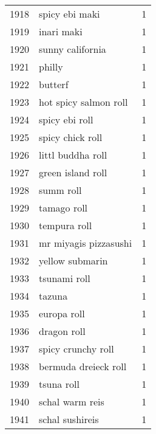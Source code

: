 \begin{tabular}{llr}
1918 &                                     spicy ebi maki &      1 \\
1919 &                                         inari maki &      1 \\
1920 &                                   sunny california &      1 \\
1921 &                                             philly &      1 \\
1922 &                                            butterf &      1 \\
1923 &                              hot spicy salmon roll &      1 \\
1924 &                                     spicy ebi roll &      1 \\
1925 &                                   spicy chick roll &      1 \\
1926 &                                  littl buddha roll &      1 \\
1927 &                                  green island roll &      1 \\
1928 &                                          summ roll &      1 \\
1929 &                                        tamago roll &      1 \\
1930 &                                       tempura roll &      1 \\
1931 &                              mr miyagis pizzasushi &      1 \\
1932 &                                    yellow submarin &      1 \\
1933 &                                       tsunami roll &      1 \\
1934 &                                             tazuna &      1 \\
1935 &                                        europa roll &      1 \\
1936 &                                        dragon roll &      1 \\
1937 &                                 spicy crunchy roll &      1 \\
1938 &                               bermuda dreieck roll &      1 \\
1939 &                                         tsuna roll &      1 \\
1940 &                                    schal warm reis &      1 \\
1941 &                                    schal sushireis &      1 \\

\end{tabular}
